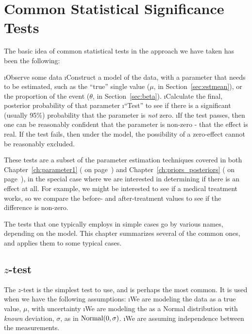 
\chapter{Common Statistical Significance Tests}\label{ch:tests}

The basic idea of common statistical tests in the approach we have taken has been the following:

\be
\i Observe some data
\i Construct a model of the data, with a parameter that needs to be estimated, such as the ``true'' single value ($\mu$, in Section~\ref{sec:estmean}), or the proportion of the event ($\theta$, in Section~\ref{sec:beta}).  
\i Calculate the final, posterior probability of that parameter
\i ``Test'' to see if there is a significant (usually 95\%) probability that the parameter is {\em not} zero.
\i If the test passes, then one can be reasonably confident that the parameter is non-zero - that the effect is real.  If the test fails, then under the model, the possibility of a zero-effect cannot be reasonably excluded.
\ee

These tests are a subset of the parameter estimation techniques covered in both Chapter~\ref{ch:parameter1} (\emph{} on page~\pageref{ch:parameter1}) and Chapter~\ref{ch:priors_posteriors} (\emph{} on page~\pageref{ch:priors_posteriors}), in the special case where we are interested in determining if there is an effect at all.  For example, we might be interested to see if a medical treatment works, so we compare the before- and after-treatment values to see if the difference is non-zero. 

The tests that one typically employs in simple cases go by various names, depending on the model.  This chapter summarizes several of the common ones, and applies them to some typical cases.

\section{$z$-test}\label{sec:ztest}

The $z$-test is the simplest test to use, and is perhaps the most common.  It is used when we have the following assumptions:
\be
\i We are modeling the data as a true value, $\mu$, with uncertainty 
\i We are modeling the as a Normal distribution with \emph{known} deviation, $\sigma$, as in ${\rm Normal}(0,\sigma)$.
\i We are assuming independence between the measurements.
\ee

